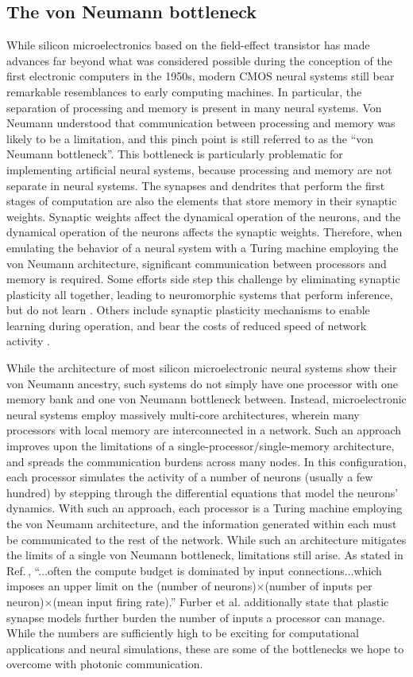 \documentclass[twocolumn]{article}
\begin{document}
\subsection{The von Neumann bottleneck}
While silicon microelectronics based on the field-effect transistor has made advances far beyond what was considered possible during the conception of the first electronic computers in the 1950s, modern CMOS neural systems still bear remarkable resemblances to early computing machines. In particular, the separation of processing and memory is present in many neural systems. Von Neumann understood that communication between processing and memory was likely to be a limitation, and this pinch point is still referred to as the ``von Neumann bottleneck''. This bottleneck is particularly problematic for implementing artificial neural systems, because processing and memory are not separate in neural systems. The synapses and dendrites that perform the first stages of computation are also the elements that store memory in their synaptic weights. Synaptic weights affect the dynamical operation of the neurons, and the dynamical operation of the neurons affects the synaptic weights. Therefore, when emulating the behavior of a neural system with a Turing machine employing the von Neumann architecture, significant communication between processors and memory is required. Some efforts side step this challenge by eliminating synaptic plasticity all together, leading to neuromorphic systems that perform inference, but do not learn \cite{mear2014}. Others include synaptic plasticity mechanisms to enable learning during operation, and bear the costs of reduced speed of network activity \cite{fuga2014,dasr2018}. 

While the architecture of most silicon microelectronic neural systems show their von Neumann ancestry, such systems do not simply have one processor with one memory bank and one von Neumann bottleneck between. Instead, microelectronic neural systems employ massively multi-core architectures, wherein many processors with local memory are interconnected in a network. Such an approach improves upon the limitations of a single-processor/single-memory architecture, and spreads the communication burdens across many nodes. In this configuration, each processor simulates the activity of a number of neurons (usually a few hundred) by stepping through the differential equations that model the neurons' dynamics. With such an approach, each processor is a Turing machine employing the von Neumann architecture, and the information generated within each must be communicated to the rest of the network. While such an architecture mitigates the limits of a single von Neumann bottleneck, limitations still arise. As stated in Ref.\,\cite{fuga2014}, ``...often the compute budget is dominated by input connections...which imposes an upper limit on the (number of neurons)$\times$(number of inputs per neuron)$\times$(mean input firing rate).'' Furber et al. additionally state that plastic synapse models further burden the number of inputs a processor can manage. While the numbers are sufficiently high to be exciting for computational applications and neural simulations, these are some of the bottlenecks we hope to overcome with photonic communication. 
\end{document}
